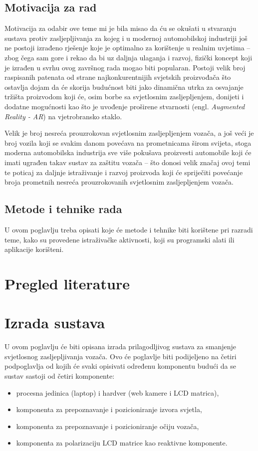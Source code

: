\documentclass{foi}
\begin{document}
\section{Motivacija za rad}

Motivacija za odabir ove teme mi je bila misao da ću se okušati u stvaranju sustava protiv zasljepljivanja za kojeg i u modernoj automobilskoj industriji još ne postoji izrađeno rješenje koje je optimalno za korištenje u realnim uvjetima – zbog čega sam gore i rekao da bi uz daljnja ulaganja i razvoj,  fizički koncept koji je izrađen u svrhu ovog završnog rada mogao biti popularan. Postoji velik broj raspisanih patenata od strane najkonkurentnijih svjetskih proizvođača što ostavlja dojam da će skorija budućnost biti jako dinamična utrka za osvajanje tržišta proizvodom koji će, osim borbe sa svjetlosnim zasljepljenjem, donijeti i dodatne mogućnosti kao što je uvođenje proširene stvarnosti (engl. \emph{Augmented Reality - AR}) na vjetrobransko staklo.

Velik je broj nesreća prouzrokovan svjetlosnim zasljepljenjem vozača, a još veći je broj vozila koji se svakim danom povećava na prometnicama širom svijeta, stoga moderna automobilska industrija sve više pokušava proizvesti automobile koji će imati ugrađen takav sustav za zaštitu vozača – što donosi velik značaj ovoj temi te poticaj za daljnje istraživanje i razvoj proizvoda koji će spriječiti povećanje broja prometnih nesreća prouzrokovanih svjetlosnim zasljepljenjem vozača.

\section{Metode i tehnike rada}

U ovom poglavlju treba opisati koje će metode i tehnike biti korištene pri razradi teme, kako su provedene istraživačke aktivnosti, koji su programski alati ili aplikacije korišteni.

\chapter{Pregled literature}

\chapter{Izrada sustava}

U ovom poglavlju će biti opisana izrada prilagodljivog sustava za smanjenje svjetlosnog zasljepljivanja vozača. Ovo će poglavlje biti podijeljeno na četiri podpoglavlja od kojih će svaki opisivati određenu komponentu budući da se sustav sastoji od četiri komponente:
\begin{itemize}[noitemsep]
    \item procesna jedinica (laptop) i hardver (web kamere i LCD matrica),
    \item komponenta za prepoznavanje i pozicioniranje izvora svjetla,
    \item komponenta za prepoznavanje i pozicioniranje očiju vozača,
    \item komponenta za polarizaciju LCD matrice kao reaktivne komponente.
\end{itemize}
\end{document}
